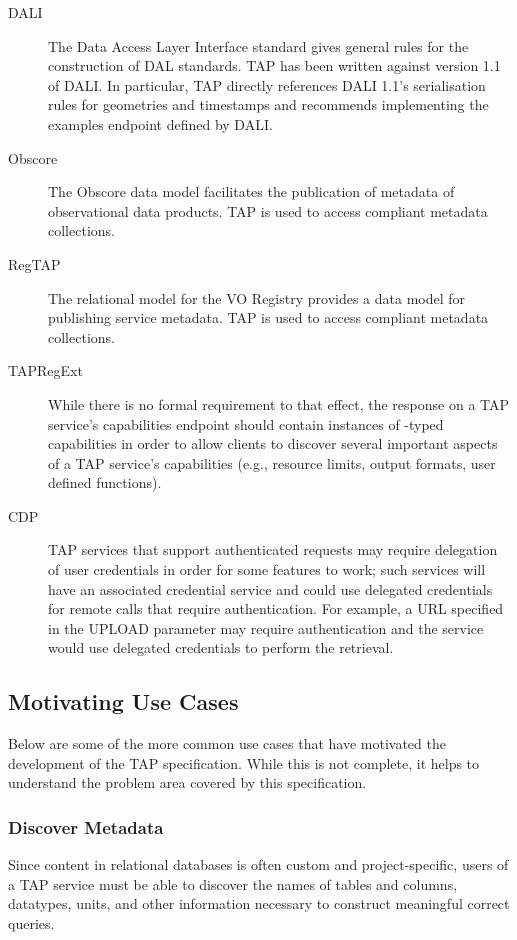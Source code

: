 \documentclass[11pt,letter]{ivoa}
\begin{document}
\begin{description}
\item[DALI \citep{2017ivoa.spec.0517D}]  The Data Access Layer Interface standard
gives general rules for the construction of DAL standards.  TAP has been
written against version 1.1 of DALI.  In particular, TAP directly
references DALI 1.1's serialisation rules for geometries and timestamps
and recommends implementing the examples endpoint defined by DALI.

\item[Obscore \citep{2011ivoa.spec.1028T}] The Obscore data model
facilitates the publication of metadata of observational data products.
TAP is used to access compliant metadata collections.

\item[RegTAP \citep{2014ivoa.spec.1208D}]  The relational model for the
VO Registry provides a data model for publishing service metadata.
TAP is used to access compliant metadata collections.

\item[TAPRegExt \citep{2012ivoa.spec.0827D}] While there is no formal
requirement to that effect, the response on a TAP service's capabilities
endpoint should contain instances of -typed
capabilities in order to allow clients to discover several important
aspects of a TAP service's capabilities (e.g., resource limits, output
formats, user defined functions).

\item[CDP \citep{2010ivoa.spec.0218P}] TAP services that support authenticated requests may require 
delegation of user credentials in order for some features to work; such services
will have an associated credential service and could use delegated credentials for 
remote calls that require authentication. For example, a URL specified in the UPLOAD
parameter may require authentication and the service would use delegated credentials
to perform the retrieval.
\end{description}

\subsection{Motivating Use Cases}
Below are some of the more common use cases that have motivated the development 
of the TAP specification. While this is not complete, it helps to understand the 
problem area covered by this specification.

\subsubsection{Discover Metadata}
Since content in relational databases is often custom and project-specific, 
users of a TAP service must be able to discover the names of tables and 
columns, datatypes, units, and other information necessary to construct 
meaningful correct queries.
\end{document}

